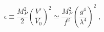 \begin{equation}
\label{eq:epsilondec}
\epsilon \equiv \frac{M_P^2}{2} \left(\frac{V'}{V_0}\right)^2 \simeq
\frac{M_P^2}{f^2}  \left(\frac{g^4}{\lambda^4}\right)^2 \;,
\end{equation} 
